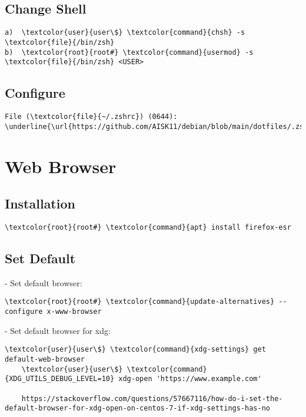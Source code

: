\documentclass[10pt, a4paper, onecolumn, openany]{book} %
\begin{document}
\subsection{Change Shell}
\begin{Verbatim}[commandchars=\\\{\}]
a)  \textcolor{user}{user\$} \textcolor{command}{chsh} -s \textcolor{file}{/bin/zsh}
b)  \textcolor{root}{root#} \textcolor{command}{usermod} -s \textcolor{file}{/bin/zsh} <USER>
\end{Verbatim}
\subsection{Configure}
\begin{Verbatim}[commandchars=\\\{\}]
File (\textcolor{file}{~/.zshrc}) (0644):
\underline{\url{https://github.com/AISK11/debian/blob/main/dotfiles/.zshrc}}
\end{Verbatim}


\section{Web Browser}
\subsection{Installation}
\begin{Verbatim}[commandchars=\\\{\}]
    \textcolor{root}{root#} \textcolor{command}{apt} install firefox-esr
\end{Verbatim}
\subsection{Set Default}
- Set default browser:
\begin{Verbatim}[commandchars=\\\{\}]
    \textcolor{root}{root#} \textcolor{command}{update-alternatives} --configure x-www-browser
\end{Verbatim}
- Set default browser for xdg:
\begin{Verbatim}[commandchars=\\\{\}]
    \textcolor{user}{user\$} \textcolor{command}{xdg-settings} get default-web-browser
    \textcolor{user}{user\$} \textcolor{command}{XDG_UTILS_DEBUG_LEVEL=10} xdg-open 'https://www.example.com'
    
    https://stackoverflow.com/questions/57667116/how-do-i-set-the-default-browser-for-xdg-open-on-centos-7-if-xdg-settings-has-no
\end{Verbatim}
\end{document}
